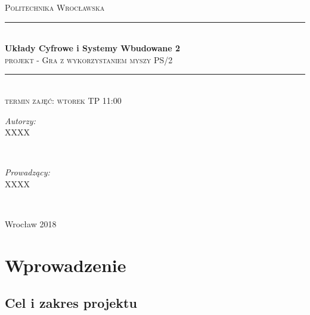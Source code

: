 \documentclass[a4paper]{article}
\begin{document}
\begin{titlepage}

\newcommand{\HRule}{\rule{\linewidth}{0.5mm}}

\center %


\textsc{\large Politechnika Wrocławska}\\[4cm]


\HRule \\[0.6cm]
{\huge \bfseries Układy Cyfrowe i Systemy Wbudowane 2}\\[0.4cm]
\textsc{\Large projekt - Gra z wykorzystaniem myszy PS/2}\\[0.4cm]
\HRule \\[0.5cm]

{\textsc{\large termin zajęć: wtorek TP 11:00}}\\[1.0cm]

\begin{minipage}{0.4\textwidth}
	\begin{flushleft} \large
		\emph{Autorzy:}\\[0.1cm]
      XXXX
	\end{flushleft}
\end{minipage}
~
\begin{minipage}{0.5\textwidth}
	\begin{flushright} \large
		\emph{Prowadzący:} \\[0.1cm]
    XXXX
	\end{flushright}
\end{minipage}\\[1cm]

\vfill

{\large Wrocław 2018}

\end{titlepage}





\tableofcontents
\newpage







\section{Wprowadzenie}
\subsection{Cel i zakres projektu}
\end{document}
